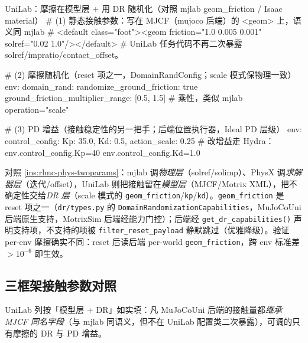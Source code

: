 \begin{codebox}[Python]{UniLab：摩擦在模型层 $+$ 用 DR 随机化（对照 mjlab geom\_friction / Isaac material）}
# (1) 静态接触参数：写在 MJCF（mujoco 后端）的 <geom> 上，语义同 mjlab
#     <default class="foot"><geom friction="1.0 0.005 0.001" solref="0.02 1.0"/></default>
#     UniLab 任务代码不再二次暴露 solref/impratio/contact_offset。

# (2) 摩擦随机化（reset 项之一，DomainRandConfig；scale 模式保物理一致）
env:
  domain_rand:
    randomize_ground_friction: true
    ground_friction_multiplier_range: [0.5, 1.5]   # 乘性，类似 mjlab operation="scale"

# (3) PD 增益（接触稳定性的另一把手；后端位置执行器，Ideal PD 层级）
env:
  control_config: {Kp: 35.0, Kd: 0.5, action_scale: 0.25}
# 改增益走 Hydra：env.control_config.Kp=40 env.control_config.Kd=1.0
\end{codebox}

\begin{note}
对照 \cref{ins:rlmc-phys-twoparams}：mjlab 调\emph{物理层}（solref/solimp）、PhysX 调\emph{求解器层}（迭代/offset），UniLab 则把接触留在\emph{模型层}（MJCF/Motrix XML），把不确定性交给\emph{DR 层}（scale 模式的 \verb|geom_friction|/\verb|kp|/\verb|kd|）。\verb|geom_friction| 是 reset 项之一（\verb|dr/types.py| 的 \verb|DomainRandomizationCapabilities|，MuJoCoUni 后端原生支持，MotrixSim 后端经能力门控）；后端经 \verb|get_dr_capabilities()| 声明支持项，不支持的项被 \verb|filter_reset_payload| 静默跳过（优雅降级）。验证 per-env 摩擦确实不同：reset 后读后端 per-world \verb|geom_friction|，跨 env 标准差 $>10^{-6}$ 即生效。
\end{note}

\subsection{三框架接触参数对照}

UniLab 列按「模型层 $+$ DR」如实填：凡 MuJoCoUni 后端的接触量都\emph{继承 MJCF 同名字段}（与 mjlab 同语义，但不在 UniLab 配置类二次暴露），可调的只有摩擦的 DR 与 PD 增益。

